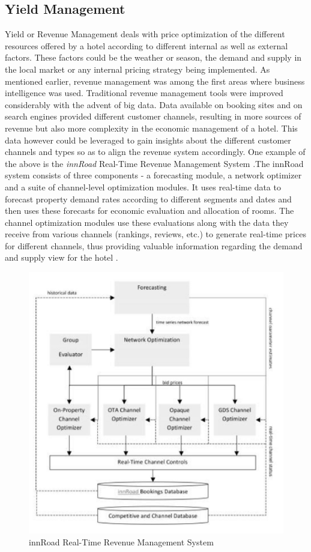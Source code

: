 \documentclass[sigconf]{acmart}
\begin{document}
\subsection{Yield Management}
Yield or Revenue Management deals with price optimization of the different resources offered by a hotel according to different internal as well as external factors. These factors could be the weather or season, the demand and supply in the local market or any internal pricing strategy being implemented.
\newline As mentioned earlier, revenue management was among the first areas where business intelligence was used. Traditional revenue management tools were improved considerably with the advent of big data. Data available on booking sites and on search engines provided different customer channels, resulting in more sources of revenue but also more complexity in the economic management of a hotel. This data however could be leveraged to gain insights about the different customer channels and types so as to align the revenue system accordingly. One example of the above is the {\em innRoad} Real-Time Revenue Management System \cite {bigdatarevenue09}.The innRoad system consists of three components - a forecasting module, a network optimizer and a suite of channel-level optimization modules. It uses real-time data to forecast property demand rates according to different segments and dates and then uses these forecasts for economic evaluation and allocation of rooms. The channel optimization modules use these evaluations along with the data they receive from various channels (rankings, reviews, etc.) to generate real-time prices for different channels, thus providing valuable information regarding the demand and supply view for the hotel \cite {bigdatarevenue09}.
\begin{figure}
	\includegraphics[width=\columnwidth]{images/innRoad.jpg}
	\caption{innRoad Real-Time Revenue Management System \cite {bigdatarevenue09}}
        \label{F:Figure3}
\end{figure}
\end{document}
